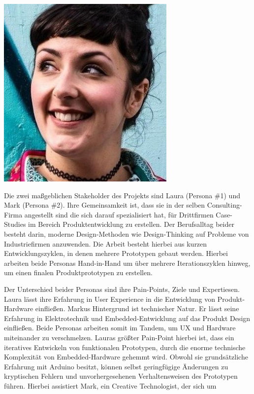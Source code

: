 \begin{tcolorbox}
    \includegraphics[width=\linewidth]{bilder/chapter3/laura.png}
\end{tcolorbox}
Die zwei maßgeblichen Stakeholder des Projekts sind Laura (Persona \#1) und Mark (Persona \#2). Ihre Gemeinsamkeit ist, dass sie in der selben Consulting-Firma angestellt sind die sich darauf spezialisiert hat, für Drittfirmen Case-Studies im Bereich Produktentwicklung zu erstellen. Der Berufsalltag beider besteht darin, moderne Design-Methoden wie Design-Thinking auf Probleme von Industriefirmen anzuwenden. Die Arbeit besteht hierbei aus kurzen Entwicklungszyklen, in denen mehrere Prototypen gebaut werden. Hierbei arbeiten beide Personas Hand-in-Hand um über mehrere Iterationszyklen hinweg, um einen finalen Produktprototypen zu erstellen.

Der Unterschied beider Personas sind ihre Pain-Points, Ziele und Expertiesen. Laura lässt ihre Erfahrung in User Experience in die Entwicklung von Produkt-Hardware einfließen. Markus Hintergrund ist technischer Natur. Er lässt seine Erfahrung in Elektrotechnik und Embedded-Entwicklung auf das Produkt Design einfließen. Beide Personas arbeiten somit im Tandem, um \ac{UX} und Hardware miteinander zu verschmelzen. Lauras größter Pain-Point hierbei ist, dass ein iteratives Entwickeln von funktionalen Prototypen, durch die enorme technische Komplexität von Embedded-Hardware gehemmt wird. Obwohl sie grundsätzliche Erfahrung mit Arduino besitzt, können selbst geringfügige Änderungen zu kryptischen Fehlern und unvorhergesehenen Verhaltensweisen des Prototypen führen. Hierbei assistiert Mark, ein Creative Technologist, der sich um 


